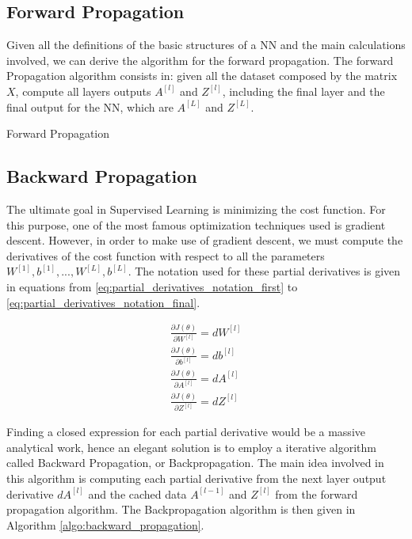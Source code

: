 \subsection{Forward Propagation}

Given all the definitions of the basic structures of a NN and the main calculations involved, we can derive the algorithm for the forward propagation. The forward Propagation algorithm consists in: given all the dataset composed by the matrix $X$, compute all layers outputs $A^{[l]}$ and $Z^{[l]}$, including the final layer and the final output for the NN, which are $A^{[L]}$ and $Z^{[L]}$.

\begin{algorithm}[H]
    \DontPrintSemicolon
    \SetAlgoLined
    \caption{Forward Propagation}
    \label{algo:forward_propagation}
\end{algorithm}

\subsection{Backward Propagation}

The ultimate goal in Supervised Learning is minimizing the cost function. For this purpose, one of the most famous optimization techniques used is gradient descent. However, in order to make use of gradient descent, we must compute the derivatives of the cost function with respect to all the parameters $W^{[1]}, b^{[1]}, ..., W^{[L]}, b^{[L]}$. The notation used for these partial derivatives is given in equations from \ref{eq:partial_derivatives_notation_first} to \ref{eq:partial_derivatives_notation_final}.

\begin{align}
\frac{\partial J(\theta)}{\partial W^{[l]}} = dW^{[l]}
\label{eq:partial_derivatives_notation_first}
\\
\frac{\partial J(\theta)}{\partial b^{[l]}} = db^{[l]} \\
\frac{\partial J(\theta)}{\partial A^{[l]}} = dA^{[l]} \\
\frac{\partial J(\theta)}{\partial Z^{[l]}} = dZ^{[l]}
\label{eq:partial_derivatives_notation_final}
\end{align}

Finding a closed expression for each partial derivative would be a massive analytical work, hence an elegant solution is to employ a iterative algorithm called Backward Propagation, or Backpropagation. The main idea involved in this algorithm is computing each partial derivative from the next layer output derivative $dA^{[l]}$ and the cached data $A^{[l-1]}$ and $Z^{[l]}$ from the forward propagation algorithm. The Backpropagation algorithm is then given in Algorithm \ref{algo:backward_propagation}.


